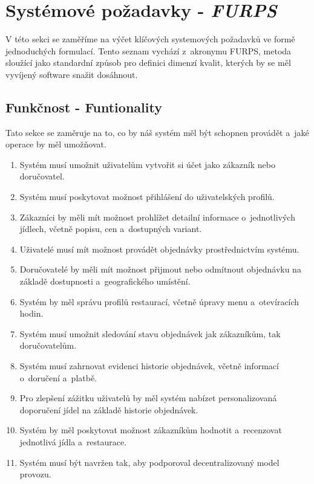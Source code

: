 \section{Systémové požadavky - \textit{FURPS}}
	\sloppy
	V této sekci se zaměříme na výčet klíčových systemových požadavků
	ve formě jednoduchých formulací. Tento seznam vychází z~akronymu 
	FURPS, metoda sloužící jako standardní způsob pro definici dimenzí kvalit,
	kterých by se měl vyvíjený software snažit dosáhnout. 

	\subsection{Funkčnost - Funtionality}

	Tato sekce se zaměruje na to, co by náš systém měl být schopnen provádět a~jaké operace by měl umožňovat.

	\begin{enumerate}[noitemsep,topsep=0pt]
		\item Systém musí umožnit uživatelům vytvořit si účet jako zákazník nebo doručovatel.
		\item Systém musí poskytovat možnost přihlášení do uživatelských profilů.
		\item Zákazníci by měli mít možnost prohlížet detailní informace o~jednotlivých jídlech, včetně popisu, cen a~dostupných variant.
		\item Uživatelé musí mít možnost provádět objednávky prostřednictvím systému.
		\item Doručovatelé by měli mít možnost přijmout nebo odmítnout objednávku na základě dostupnosti a~geografického umístění.
		\item Systém by měl správu profilů restaurací, včetně úpravy menu a~otevíracích hodin.
		\item Systém musí umožnit sledování stavu objednávek jak zákazníkům, tak doručovatelům.
		\item Systém musí zahrnovat evidenci historie objednávek, včetně informací o~doručení a~platbě.
		\item Pro zlepšení zážitku uživatelů by měl systém nabízet personalizovaná doporučení jídel na základě historie objednávek.
		\item Systém by měl poskytovat možnost zákazníkům hodnotit a~recenzovat jednotlivá jídla a~restaurace.
		\item Systém musí být navržen tak, aby podporoval decentralizovaný model provozu.
	\end{enumerate}

